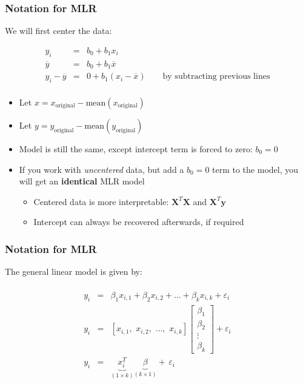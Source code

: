 \begin{frame}\frametitle{Notation for MLR}

	We will first center the data:

	$$
	\begin{array}{rcl}
		y_i &=& b_0 + b_1 x_i \\
		\overline{y} &=& b_0 + b_1 \overline{x} \\
		y_i - \overline{y} &=& 0 +b_1(x_i - \overline{x}) \qquad \text{by subtracting previous lines} \\
	\end{array}
	$$
	\begin{itemize}
		\item	Let $x = x_\text{original} - \text{mean}\left(x_\text{original} \right)$
		\item	Let $y = y_\text{original} - \text{mean}\left(y_\text{original} \right)$
		\item	Model is still the same, except intercept term is forced to zero: $b_0 = 0$
	\end{itemize}
	\begin{itemize}
		\item	If you work with \emph{uncentered} data, but add a $b_0 = 0$ term to the model, you will get an \textbf{identical} MLR model
		\begin{itemize}
			\item	Centered data is more interpretable: $\mathbf{X}^T\mathbf{X}$ and $\mathbf{X}^T\mathbf{y}$
			\item	Intercept can always be recovered afterwards, if required
		\end{itemize}
	\end{itemize}
\end{frame}

\begin{frame}\frametitle{Notation for MLR}

	The general linear model is given by:

	$$
	\begin{array}{rcl}
		\\
		y_i &=& \beta_1 x_{i,1} + \beta_2x_{i,2} + \ldots + \beta_kx_{i,k} + \varepsilon_i \\
		y_i &=& [x_{i,1},\,\, x_{i,2},\,\, \ldots,\,\, x_{i,k}]
		\begin{bmatrix}
			\beta_1 \\
			\beta_2 \\
			\vdots \\
			\beta_k
		\end{bmatrix}
		+ \varepsilon_i \\
		y_i &=& \underbrace{\mathit{x}_i^T}_{(1 \times k)} \underbrace{\beta}_{(k \times 1)} + \,\varepsilon_i
	\end{array}
	$$
\end{frame}

